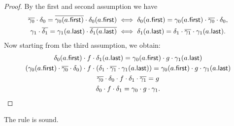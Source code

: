 \begin{proof}
    By the first and second assumption we have
    \begin{gather*}
        \overline{\gamma_0} \cdot \delta_0 = \overline{\gamma_0(a . \mathsf{first})} \cdot \delta_0(a . \mathsf{first}) \iff \delta_0(a . \mathsf{first}) = \gamma_0(a . \mathsf{first}) \cdot \overline{\gamma_0} \cdot \delta_0, \\
        \gamma_1 \cdot \overline{\delta_1} = \gamma_1(a . \mathsf{last}) \cdot \overline{\delta_1(a . \mathsf{last})} \iff \delta_1(a . \mathsf{last}) = \delta_1 \cdot \overline{\gamma_1} \cdot \gamma_1(a . \mathsf{last}).
    \end{gather*}
    Now starting from the third assumption, we obtain:
    \begin{gather*}
        \delta_0(a . \mathsf{first}) \cdot f \cdot \delta_1(a . \mathsf{last}) = \gamma_0(a . \mathsf{first}) \cdot g \cdot \gamma_1(a . \mathsf{last}) \\
        \left( \gamma_0(a . \mathsf{first}) \cdot \overline{\gamma_0} \cdot \delta_0 \right)  \cdot f \cdot \left( \delta_1 \cdot \overline{\gamma_1} \cdot \gamma_1(a . \mathsf{last}) \right) = \gamma_0(a . \mathsf{first}) \cdot g \cdot \gamma_1(a . \mathsf{last}) \\
        \overline{\gamma_0} \cdot \delta_0 \cdot f \cdot \delta_1 \cdot \overline{\gamma_1} = g \\
        \delta_0 \cdot f \cdot \delta_1 = \gamma_0 \cdot g \cdot \gamma_1. \qedhere
    \end{gather*}
\end{proof}

\begin{lemma}\label{lem:good-interface-rule-soundness}
    The rule  is sound.
\end{lemma}

